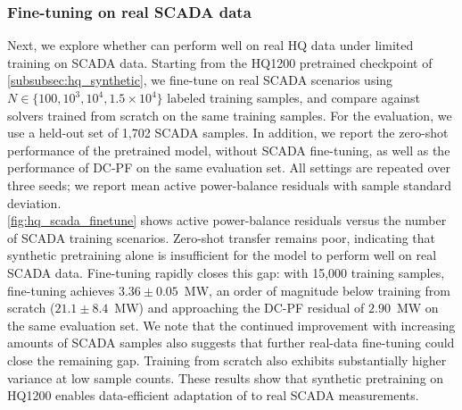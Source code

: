 \begin{table}\centering\small
{}
\caption{Mean active and reactive power-balance residuals on the synthetic HQ1200 dataset.
Errors denote standard deviation over three seeds.
Bold values indicate the best learning-based method.}
\label{tab:hq1200_results}
\end{table}

\subsubsection{Fine-tuning on real SCADA data}
\label{subsubsec:hq_scada}

Next, we explore whether \genco can perform well on real HQ data under limited training on SCADA data.
Starting from the HQ1200 pretrained checkpoint of \cref{subsubsec:hq_synthetic}, we fine-tune on real SCADA scenarios using $N\in\{100,10^3,10^4,1.5\times10^4\}$ labeled training samples, and compare against \genco solvers trained from scratch on the same training samples. For the evaluation, we use a held-out set of 1{,}702 SCADA samples. In addition, we report the zero-shot performance of the pretrained \genco model, without SCADA fine-tuning, as well as the performance of DC-PF on the same evaluation set. All settings are repeated over three seeds; we report mean active power-balance residuals with sample standard deviation.\\

\cref{fig:hq_scada_finetune} shows active power-balance residuals versus the number of SCADA training scenarios. Zero-shot transfer remains poor, indicating that synthetic pretraining alone is insufficient for the model to perform well on real SCADA data. Fine-tuning rapidly closes this gap: with 15,000 training samples, fine-tuning achieves $3.36\pm0.05$~MW, an order of magnitude below training from scratch ($21.1\pm8.4$~MW) and approaching the DC-PF residual of $2.90$~MW on the same evaluation set. We note that the continued improvement with increasing amounts of SCADA samples also suggests that further real-data fine-tuning could close the remaining gap. Training from scratch also exhibits substantially higher variance at low sample counts. These results show that synthetic pretraining on HQ1200 enables data-efficient adaptation of \genco to real SCADA measurements.\\

